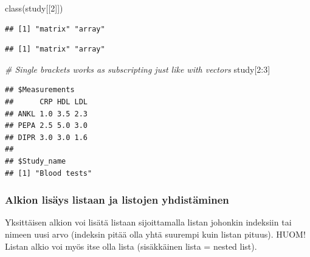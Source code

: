 \documentclass[
]{book}
\newenvironment{Shaded}{\begin{snugshade}}{\end{snugshade}}
\newcommand{\CommentTok}[1]{\textcolor[rgb]{0.56,0.35,0.01}{\textit{#1}}}
\newcommand{\DecValTok}[1]{\textcolor[rgb]{0.00,0.00,0.81}{#1}}
\newcommand{\FunctionTok}[1]{\textcolor[rgb]{0.00,0.00,0.00}{#1}}
\newcommand{\NormalTok}[1]{#1}
\newcommand{\SpecialCharTok}[1]{\textcolor[rgb]{0.00,0.00,0.00}{#1}}
\begin{document}
\begin{Shaded}
\begin{Highlighting}[]
\FunctionTok{class}\NormalTok{(study[[}\DecValTok{2}\NormalTok{]])}
\end{Highlighting}
\end{Shaded}

\begin{verbatim}
## [1] "matrix" "array"
\end{verbatim}

\begin{Shaded}
\end{Shaded}

\begin{verbatim}
## [1] "matrix" "array"
\end{verbatim}

\begin{Shaded}
\begin{Highlighting}[]
\CommentTok{\# Single brackets works as subscripting just like with vectors}
\NormalTok{study[}\DecValTok{2}\SpecialCharTok{:}\DecValTok{3}\NormalTok{]}
\end{Highlighting}
\end{Shaded}

\begin{verbatim}
## $Measurements
##      CRP HDL LDL
## ANKL 1.0 3.5 2.3
## PEPA 2.5 5.0 3.0
## DIPR 3.0 3.0 1.6
## 
## $Study_name
## [1] "Blood tests"
\end{verbatim}

\hypertarget{alkion-lisuxe4ys-listaan-ja-listojen-yhdistuxe4minen}{%
\subsubsection{Alkion lisäys listaan ja listojen yhdistäminen}\label{alkion-lisuxe4ys-listaan-ja-listojen-yhdistuxe4minen}}

Yksittäisen alkion voi lisätä listaan sijoittamalla listan johonkin indeksiin tai nimeen uusi arvo (indeksin pitää olla yhtä suurempi kuin listan pituus). HUOM! Listan alkio voi myös itse olla lista (sisäkkäinen lista = nested list).
\end{document}
